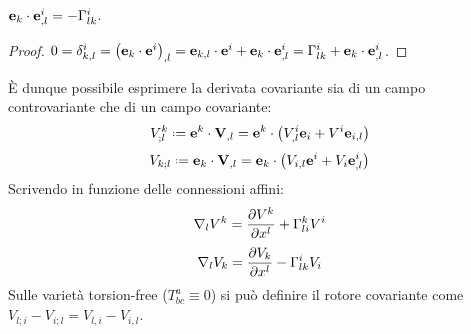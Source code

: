 \begin{proposition}
	$ \mathbf{e}_k \cdot \mathbf{e}^i_{,l} = - \Gamma^i_{lk} $.
\end{proposition}
\begin{proof}
	$ 0 = \delta^i_{k,l} = \left( \mathbf{e}_k \cdot \mathbf{e}^i \right)_{,l} = \mathbf{e}_{k,l} \cdot \mathbf{e}^i + \mathbf{e}_k \cdot \mathbf{e}^i_{,l} = \Gamma^i_{lk} + \mathbf{e}_k \cdot \mathbf{e}^i_{,l} $.
\end{proof}
È dunque possibile esprimere la derivata covariante sia di un campo controvariante che di un campo covariante:
\begin{equation}
	V^k_{;l} \defeq \ve{e}^k \cdot \ve{V}_{,l} = \ve{e}^k \cdot \left( V^i_{,l} \ve{e}_i + V^i \ve{e}_{i,l} \right)
	\label{eq:4.8}
\end{equation}
\begin{equation}
	V_{k;l} \defeq \ve{e}_k \cdot \ve{V}_{,l} = \ve{e}_k \cdot \left( V_{i,l} \ve{e}^i + V_i \ve{e}^i_{,l} \right)
	\label{eq:4.9}
\end{equation}
Scrivendo in funzione delle connessioni affini:
\begin{equation}
	\nabla_l V^k = \frac{\partial V^k}{\partial x^l} + \Gamma^k_{li} V^i
	\label{eq:4.10}
\end{equation}
\begin{equation}
	\nabla_l V_k = \frac{\partial V_k}{\partial x^l} - \Gamma^i_{lk} V_i
	\label{eq:4.11}
\end{equation}
Sulle varietà torsion-free ($ T^a_{bc} \equiv 0 $) si può definire il rotore covariante come $ V_{l;i} - V_{i;l} = V_{l,i} - V_{i,l} $.

